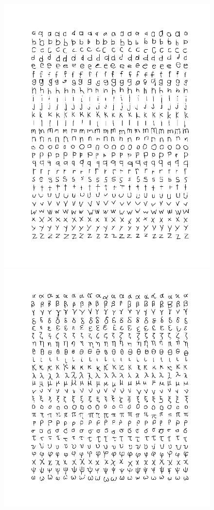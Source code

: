 \begin{figure}[h]
\centering
\begin{minipage}{.32\textwidth}
  \centering
  \includegraphics[width=\linewidth]{images/latin}
\end{minipage}
\begin{minipage}{.32\textwidth}
  \centering
  \includegraphics[width=\linewidth]{images/greek}

\end{minipage}
\end{figure}
